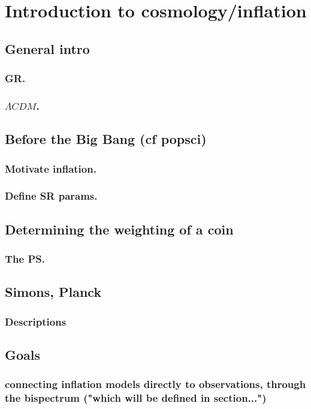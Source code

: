 %
\chapter{Introduction to cosmology/inflation}
\section{General intro}\label{sec:general_intro}
    \subsection{GR.}
    \subsection{$\Lambda CDM$.}
\section{Before the Big Bang (cf popsci)}
    \subsection{Motivate inflation.}
    \subsection{Define SR params.}
\section{Determining the weighting of a coin}
    \subsection{The PS.}
\section{Simons, Planck}
    \subsection{Descriptions}
\section{Goals}
    \subsection{connecting inflation models directly to observations, through the bispectrum ("which will be defined in section...")}
